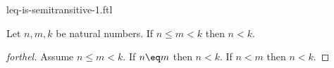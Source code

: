 \documentclass{stex}
\begin{document}
\begin{smodule}{leq-is-semitransitive-1.ftl}


\begin{proposition}[forthel,id=LeqIsSemitransitiveIProp]
  Let $n, m, k$ be natural numbers.
  If $n \leq m \less k$ then $n \less k$.
\end{proposition}
\begin{proof}[forthel]
  Assume $n \leq m \less k$.
  If $n \eq m$ then $n \less k$.
  If $n \less m$ then $n \less k$.
\end{proof}

\end{smodule}
\end{document}
